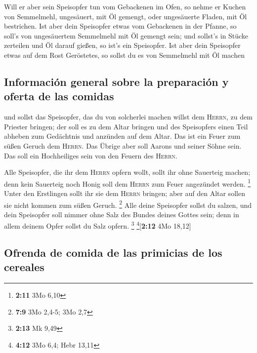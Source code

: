  Will er aber sein Speisopfer tun vom Gebackenen im Ofen,
so nehme er Kuchen von Semmelmehl, ungesäuert, mit Öl gemengt, oder
ungesäuerte Fladen, mit Öl bestrichen.  Ist aber dein
Speisopfer etwas vom Gebackenen in der Pfanne, so soll's von
ungesäuertem Semmelmehl mit Öl gemengt sein;  und sollst's
in Stücke zerteilen und Öl darauf gießen, so ist's ein Speisopfer.
 Ist aber dein Speisopfer etwas auf dem Rost Geröstetes,
so sollst du es von Semmelmehl mit Öl machen

\hypertarget{informaciuxf3n-general-sobre-la-preparaciuxf3n-y-oferta-de-las-comidas}{%
\subsection{Información general sobre la preparación y oferta de las
comidas}\label{informaciuxf3n-general-sobre-la-preparaciuxf3n-y-oferta-de-las-comidas}}

 und sollst das Speisopfer, das du von solcherlei machen
willst dem \textsc{Herrn}, zu dem Priester bringen; der soll es zu dem
Altar bringen  und des Speisopfers einen Teil abheben zum
Gedächtnis und anzünden auf dem Altar. Das ist ein Feuer zum süßen
Geruch dem \textsc{Herrn}.  Das Übrige aber soll Aarons
und seiner Söhne sein. Das soll ein Hochheiliges sein von den Feuern des
\textsc{Herrn}.

 Alle Speisopfer, die ihr dem \textsc{Herrn} opfern
wollt, sollt ihr ohne Sauerteig machen; denn kein Sauerteig noch Honig
soll dem \textsc{Herrn} zum Feuer angezündet werden. \footnote{\textbf{2:11}
  3Mo 6,10}  Unter den Erstlingen sollt ihr sie dem
\textsc{Herrn} bringen; aber auf den Altar sollen sie nicht kommen zum
süßen Geruch. \footnote{\textbf{7:9} 3Mo 2,4-5; 3Mo 2,7} 
Alle deine Speisopfer sollst du salzen, und dein Speisopfer soll nimmer
ohne Salz des Bundes deines Gottes sein; denn in allem deinem Opfer
sollst du Salz opfern. \footnote{\textbf{2:13} Mk 9,49}
\footnote{\textbf{4:12} 3Mo 6,4; Hebr 13,11}{[}\textbf{2:12} 4Mo
18,12{]}

\hypertarget{ofrenda-de-comida-de-las-primicias-de-los-cereales}{%
\subsection{Ofrenda de comida de las primicias de los
cereales}\label{ofrenda-de-comida-de-las-primicias-de-los-cereales}}

